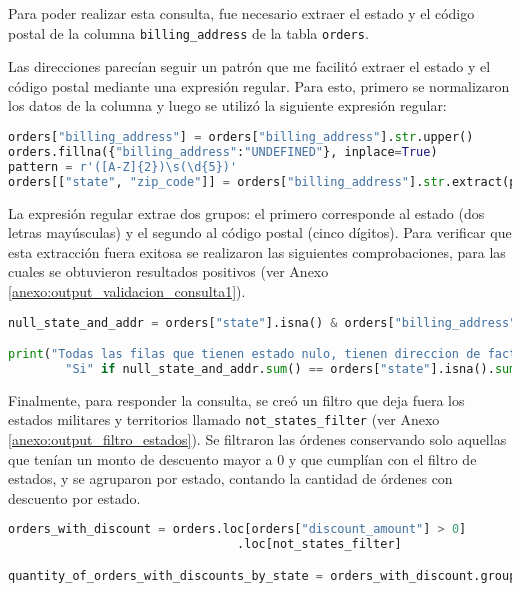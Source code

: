 Para poder realizar esta consulta, fue necesario extraer el estado y el código postal de la columna \texttt{billing\_address} de la tabla \texttt{orders}. 

Las direcciones parecían seguir un patrón que me facilitó extraer el estado y el código postal mediante una expresión regular.
Para esto, primero se normalizaron los datos de la columna y luego se utilizó la siguiente expresión regular:

\begin{lstlisting}[language=Python]
orders["billing_address"] = orders["billing_address"].str.upper()
orders.fillna({"billing_address":"UNDEFINED"}, inplace=True)
pattern = r'([A-Z]{2})\s(\d{5})'
orders[["state", "zip_code"]] = orders["billing_address"].str.extract(pattern)
\end{lstlisting}

La expresión regular extrae dos grupos: el primero corresponde al estado (dos letras mayúsculas) y el segundo al código postal (cinco dígitos).
Para verificar que esta extracción fuera exitosa se realizaron las siguientes comprobaciones, para las cuales se obtuvieron resultados positivos (ver Anexo \ref{anexo:output_validacion_consulta1}).

\begin{lstlisting}[language=Python, xleftmargin=25pt, xrightmargin=25pt, ]
null_state_and_addr = orders["state"].isna() & orders["billing_address"].str.contains("UNDEFINED")

print("Todas las filas que tienen estado nulo, tienen direccion de facturacion indefinida?", 
        "Si" if null_state_and_addr.sum() == orders["state"].isna().sum() else "No")
\end{lstlisting}

Finalmente, para responder la consulta, se creó un filtro que deja fuera los estados militares y territorios llamado \texttt{not\_states\_filter} (ver Anexo \ref{anexo:output_filtro_estados}). Se filtraron las órdenes conservando solo aquellas que tenían un monto de descuento mayor a 0 y que cumplían con el filtro de estados, y se agruparon por estado, contando la cantidad de órdenes con descuento por estado.

\begin{lstlisting}[language=Python, xleftmargin=35pt, xrightmargin=35pt, ]
orders_with_discount = orders.loc[orders["discount_amount"] > 0]
                                .loc[not_states_filter]

quantity_of_orders_with_discounts_by_state = orders_with_discount.groupby("state")["order_id"]
                                                                        .count().reset_index()
\end{lstlisting}

